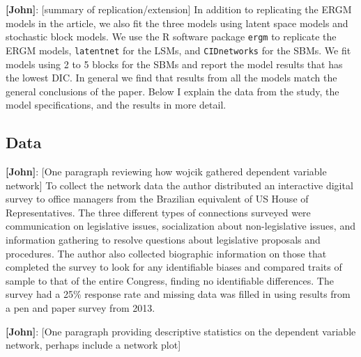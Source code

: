 \documentclass[fleqn,12pt]{wlscirep}
\begin{document}
{\bf [John]}: [summary of replication/extension] In addition to replicating the ERGM models in the article, we also fit the three models using latent space models and stochastic block models. We use the R software package \texttt{ergm} to replicate the ERGM models, \texttt{latentnet} for the LSMs, and \texttt{CIDnetworks} for the SBMs.  We fit models using 2 to 5 blocks for the SBMs and report the model results that has the lowest DIC. In general we find that results from all the models match the general conclusions of the paper. Below I explain the data from the study, the model specifications, and the results in more detail.

\subsection{Data}

{\bf [John]}: [One paragraph reviewing how wojcik gathered dependent variable network] To collect the network data the author distributed an interactive digital survey to office managers from the Brazilian equivalent of US House of Representatives. The three different types of connections surveyed were communication on legislative issues, socialization about non-legislative issues, and information gathering to resolve questions about legislative proposals and procedures. The author also collected biographic information on those that completed the survey to look for any identifiable biases and compared traits of sample to that of the entire Congress, finding no identifiable differences. The survey had a 25\% response rate and missing data was filled in using results from a pen and paper survey from 2013.

{\bf [John]}: [One paragraph providing descriptive statistics on the dependent variable network, perhaps include a network plot]
\end{document}
